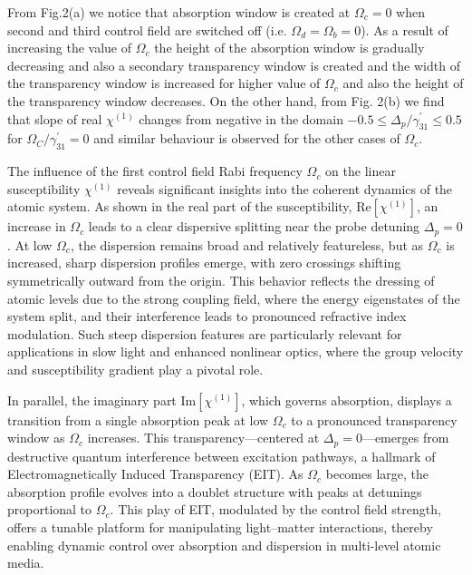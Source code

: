 \documentclass[12pt,a4paper]{article}
\begin{document}
From Fig.2(a) we notice that absorption window is created at $\Omega_{c}=0$ when second and third control field are switched off (i.e. $\Omega_{d}=\Omega_{b}=0$). As a result of increasing the value of $\Omega_{c}$ the height of the absorption window is gradually decreasing and also a secondary transparency window is created and the width of the transparency window is increased for higher value of $\Omega_{c}$ and also the height of the transparency window decreases. On the other hand, from Fig. 2(b) we find that slope of real $\chi^{(1)}$ changes from negative in the domain $-0.5 \leq \Delta_{p}/\gamma^{\prime}_{31} \leq 0.5$ for $\Omega_{C}/\gamma^{\prime}_{31}=0$ and similar behaviour is observed for the other cases of $\Omega_{c}$.

The influence of the first control field Rabi frequency $\Omega_c$ on the linear susceptibility $\chi^{(1)}$ reveals significant insights into the coherent dynamics of the atomic system. As shown in the real part of the susceptibility, $\mathrm{Re}[\chi^{(1)}]$, an increase in $\Omega_c$ leads to a clear dispersive splitting near the probe detuning $\Delta_p = 0$. At low $\Omega_c$, the dispersion remains broad and relatively featureless, but as $\Omega_c$ is increased, sharp dispersion profiles emerge, with zero crossings shifting symmetrically outward from the origin. This behavior reflects the dressing of atomic levels due to the strong coupling field, where the energy eigenstates of the system split, and their interference leads to pronounced refractive index modulation. Such steep dispersion features are particularly relevant for applications in slow light and enhanced nonlinear optics, where the group velocity and susceptibility gradient play a pivotal role.

In parallel, the imaginary part $\mathrm{Im}[\chi^{(1)}]$, which governs absorption, displays a transition from a single absorption peak at low $\Omega_c$ to a pronounced transparency window as $\Omega_c$ increases. This transparency---centered at $\Delta_p = 0$---emerges from destructive quantum interference between excitation pathways, a hallmark of Electromagnetically Induced Transparency (EIT). As $\Omega_c$ becomes large, the absorption profile evolves into a doublet structure with peaks at detunings proportional to $\Omega_c$. This play of EIT, modulated by the control field strength, offers a tunable platform for manipulating light--matter interactions, thereby enabling dynamic control over absorption and dispersion in multi-level atomic media.
\end{document}

